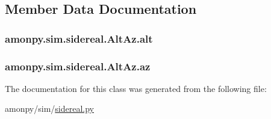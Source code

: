 \subsection{Member Data Documentation}
\hypertarget{classamonpy_1_1sim_1_1sidereal_1_1_alt_az_a83fa807a0712e96e75f710d795130909}{
\subsubsection[{alt}]{\setlength{\rightskip}{0pt plus 5cm}amonpy.\-sim.\-sidereal.\-Alt\-Az.\-alt}}\label{classamonpy_1_1sim_1_1sidereal_1_1_alt_az_a83fa807a0712e96e75f710d795130909}
\hypertarget{classamonpy_1_1sim_1_1sidereal_1_1_alt_az_a6ab14f1c259aa771a74bd004ae99e1ce}{
\subsubsection[{az}]{\setlength{\rightskip}{0pt plus 5cm}amonpy.\-sim.\-sidereal.\-Alt\-Az.\-az}}\label{classamonpy_1_1sim_1_1sidereal_1_1_alt_az_a6ab14f1c259aa771a74bd004ae99e1ce}


The documentation for this class was generated from the following file\-:\begin{DoxyCompactItemize}
\item 
amonpy/sim/\hyperlink{sidereal_8py}{sidereal.\-py}\end{DoxyCompactItemize}
